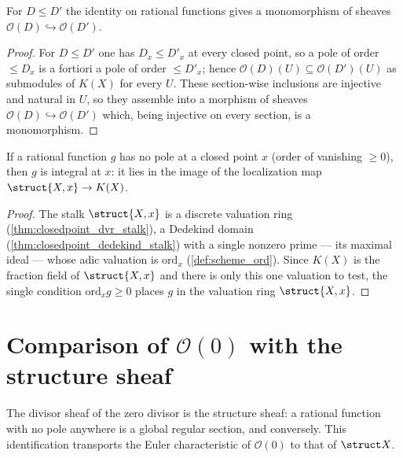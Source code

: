 \begin{theorem}
  \label{thm:divisorSheafLE}
  \leanok
  For \(D \le D'\) the identity on rational functions gives a monomorphism of sheaves
  \(\mathcal O(D) \hookrightarrow \mathcal O(D')\).
\end{theorem}
\begin{proof}
  \leanok
  For \(D \le D'\) one has \(D_x \le D'_x\) at every closed point, so a pole of order \(\le D_x\) is
  a fortiori a pole of order \(\le D'_x\); hence \(\mathcal O(D)(U) \subseteq \mathcal O(D')(U)\) as
  submodules of \(K(X)\) for every \(U\). These section-wise inclusions are injective and natural in
  \(U\), so they assemble into a morphism of sheaves \(\mathcal O(D) \hookrightarrow \mathcal O(D')\)
  which, being injective on every section, is a monomorphism.
\end{proof}

\begin{lemma}
  \label{lem:exists_stalk_of_ord_le_one}
  \leanok
  If a rational function \(g\) has no pole at a closed point \(x\) (order of vanishing \(\ge 0\)),
  then \(g\) is integral at \(x\): it lies in the image of the localization map
  \(\struct{X,x} \to K(X)\).
\end{lemma}
\begin{proof}
  \leanok
  The stalk \(\struct{X,x}\) is a discrete valuation ring (\ref{thm:closedpoint_dvr_stalk}), a
  Dedekind domain (\ref{thm:closedpoint_dedekind_stalk}) with a single nonzero prime --- its
  maximal ideal --- whose adic valuation is \(\mathrm{ord}_x\) (\ref{def:scheme_ord}). Since
  \(K(X)\) is the fraction field of \(\struct{X,x}\) and there is only this one valuation to test,
  the single condition \(\mathrm{ord}_x g \ge 0\) places \(g\) in the valuation ring
  \(\struct{X,x}\).
\end{proof}

\section{Comparison of \(\mathcal O(0)\) with the structure sheaf}

The divisor sheaf of the zero divisor is the structure sheaf: a rational function with no pole
anywhere is a global regular section, and conversely. This identification transports the Euler
characteristic of \(\mathcal O(0)\) to that of \(\struct X\).

